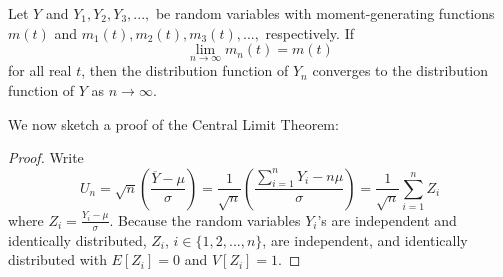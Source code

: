 \documentclass[12pt, a4paper, twoside, openright, titlepage]{book}
\begin{document}
\begin{thm}{}{}
    Let $Y$ and $Y_1,Y_2,Y_3,...,$ be random variables with moment-generating functions $m(t)$ and $m_1(t),m_2(t),m_3(t),...,$ respectively. If \begin{equation*}
        \lim\limits_{n\rightarrow \infty}m_n(t) = m(t)
    \end{equation*}
    for all real $t$, then the distribution function of $Y_n$ converges to the distribution function of $Y$ as $n\rightarrow \infty$.
\end{thm}

We now sketch a proof of the Central Limit Theorem:

\begin{proof}{}{}
    Write \begin{equation*}
        U_n = \sqrt{n}\left(\frac{\overline{Y}-\mu}{\sigma}\right) = \frac{1}{\sqrt{n}}\left(\frac{\sum_{i=1}^nY_i - n\mu}{\sigma}\right) = \frac{1}{\sqrt{n}}\sum\limits_{i=1}^nZ_i
    \end{equation*}
    where $Z_i = \frac{Y_i - \mu}{\sigma}$. Because the random variables $Y_i$'s are independent and identically distributed, $Z_i$, $i \in \{1,2,...,n\}$, are independent, and identically distributed with $E[Z_i] = 0$ and $V[Z_i] = 1$.


\end{proof}
\end{document}
